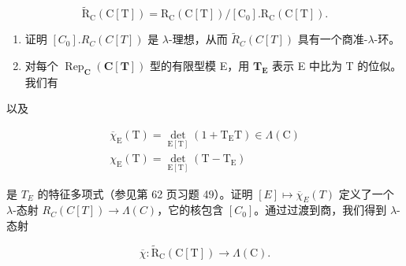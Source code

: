 \[
\tilde {\mathrm{R}} _ {\mathrm{C}} (\mathrm{C} [ \mathrm{T} ]) = \mathrm{R} _ {\mathrm{C}} (\mathrm{C} [ \mathrm{T} ]) / [ \mathrm{C} _ {0} ]. \mathrm{R} _ {\mathrm{C}} (\mathrm{C} [ \mathrm{T} ]).
\]

\begin{enumerate}
\def\labelenumi{\alph{enumi})}
\item
  证明 \([C_{0}].R_{C}(C[T])\) 是 \(\lambda\)-理想，从而 \(\tilde{R}_{C}(C[T])\) 具有一个商准-\(\lambda\)-环。
\item
  对每个 \(\operatorname{Rep}_{\mathbf{C}}(\mathbf{C}[\mathbf{T}])\) 型的有限型模 E，用 \(\mathbf{T}_{\mathbf{E}}\) 表示 E 中比为 T 的位似。我们有
\end{enumerate}

以及

\[
\begin{array}{l} \overline {{\chi}} _ {\mathrm{E}} (\mathrm{T}) = \det _ {\mathrm{E} [ \mathrm{T} ]} (1 + \mathrm{T} _ {\mathrm{E}} \mathrm{T}) \in \Lambda (\mathrm{C}) \\ \chi_ {\mathrm{E}} (\mathrm{T}) = \det _ {\mathrm{E} [ \mathrm{T} ]} (\mathrm{T} - \mathrm{T} _ {\mathrm{E}}) \end{array}
\]

是 \(T_{E}\) 的特征多项式（参见第 62 页习题 49）。证明 \([E] \mapsto \overline{\chi}_{E}(T)\) 定义了一个 \(\lambda\)-态射 \(R_{C}(C[T]) \to \Lambda(C)\)，它的核包含 \([C_{0}]\)。通过过渡到商，我们得到 \(\lambda\)-态射

\[
\overline {{\chi}}: \tilde {\mathrm{R}} _ {\mathrm{C}} (\mathrm{C} [ \mathrm{T} ]) \to \Lambda (\mathrm{C}).
\]

